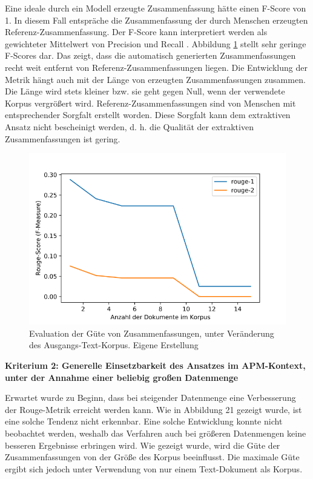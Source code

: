 Eine ideale durch ein Modell erzeugte Zusammenfassung hätte einen F-Score von 1. In diesem Fall entspräche die Zusammenfassung der durch Menschen erzeugten Referenz-Zusammenfassung. Der F-Score kann interpretiert werden als gewichteter Mittelwert von Precision und Recall \cite{scikit2}. Abbildung \ref{Abbildung:rouge-metrics} stellt sehr geringe F-Scores dar. Das zeigt, dass die automatisch generierten Zusammenfassungen recht weit entfernt von Referenz-Zusammenfassungen liegen. Die Entwicklung der Metrik hängt auch mit der Länge von erzeugten Zusammenfassungen zusammen. Die Länge wird stets kleiner bzw. sie geht gegen Null, wenn der verwendete Korpus vergrößert wird.
Referenz-Zusammenfassungen sind von Menschen mit entsprechender Sorgfalt erstellt worden. Diese Sorgfalt kann dem extraktiven Ansatz nicht bescheinigt werden, d. h. die Qualität der extraktiven Zusammenfassungen ist gering.

\begin{figure}[h]
\centering
\includegraphics[scale=0.95]{content/pics/Picture_21.png}
\caption{Evaluation der Güte von Zusammenfassungen, unter Veränderung des Ausgangs-Text-Korpus. Eigene Erstellung}
\label{Abbildung:rouge-metrics}
\end{figure}

{\bf Kriterium 2: Generelle Einsetzbarkeit des Ansatzes im APM-Kontext, unter der Annahme einer beliebig großen Datenmenge}

Erwartet wurde zu Beginn, dass bei steigender Datenmenge eine Verbesserung der Rouge-Metrik erreicht werden kann. Wie in Abbildung 21 gezeigt wurde, ist eine solche Tendenz nicht erkennbar.
Eine solche Entwicklung konnte nicht beobachtet werden, weshalb das Verfahren auch bei größeren Datenmengen keine besseren Ergebnisse erbringen wird. 
Wie gezeigt wurde, wird die Güte der Zusammenfassungen von der Größe des Korpus beeinflusst. Die maximale Güte ergibt sich jedoch unter Verwendung von nur einem Text-Dokument als Korpus.

